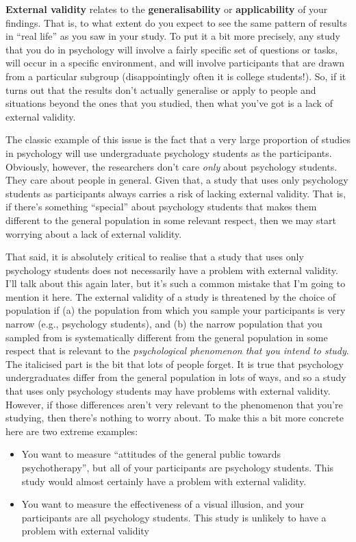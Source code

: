 \documentclass[
]{book}
\providecommand{\tightlist}{%
  \setlength{\itemsep}{0pt}\setlength{\parskip}{0pt}}
\begin{document}
\textbf{External validity} relates to the \textbf{generalisability} or \textbf{applicability} of your findings. That is, to what extent do you expect to see the same pattern of results in ``real life'' as you saw in your study. To put it a bit more precisely, any study that you do in psychology will involve a fairly specific set of questions or tasks, will occur in a specific environment, and will involve participants that are drawn from a particular subgroup (disappointingly often it is college students!). So, if it turns out that the results don't actually generalise or apply to people and situations beyond the ones that you studied, then what you've got is a lack of external validity.

The classic example of this issue is the fact that a very large proportion of studies in psychology will use undergraduate psychology students as the participants. Obviously, however, the researchers don't care \emph{only} about psychology students. They care about people in general. Given that, a study that uses only psychology students as participants always carries a risk of lacking external validity. That is, if there's something ``special'' about psychology students that makes them different to the general population in some relevant respect, then we may start worrying about a lack of external validity.

That said, it is absolutely critical to realise that a study that uses only psychology students does not necessarily have a problem with external validity. I'll talk about this again later, but it's such a common mistake that I'm going to mention it here. The external validity of a study is threatened by the choice of population if (a) the population from which you sample your participants is very narrow (e.g., psychology students), and (b) the narrow population that you sampled from is systematically different from the general population in some respect that is relevant to the \emph{psychological phenomenon that you intend to study}. The italicised part is the bit that lots of people forget. It is true that psychology undergraduates differ from the general population in lots of ways, and so a study that uses only psychology students may have problems with external validity. However, if those differences aren't very relevant to the phenomenon that you're studying, then there's nothing to worry about. To make this a bit more concrete here are two extreme examples:

\begin{itemize}
\tightlist
\item
  You want to measure ``attitudes of the general public towards psychotherapy'', but all of your participants are psychology students. This study would almost certainly have a problem with external validity.
\item
  You want to measure the effectiveness of a visual illusion, and your participants are all psychology students. This study is unlikely to have a problem with external validity
\end{itemize}
\end{document}
